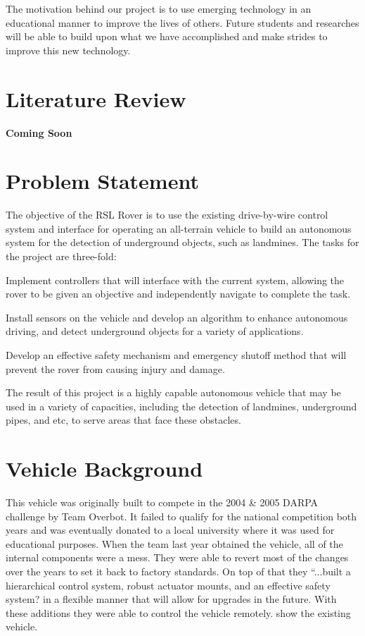 The motivation behind our project is to use emerging technology in an educational manner to improve the lives of others.  Future students and researches will be able to build upon what we have accomplished and make strides to improve this new technology.

\section{Literature Review}

{\bf Coming Soon}

\section{Problem Statement}

The objective of the RSL Rover is to use the existing drive-by-wire control system and interface for operating an all-terrain vehicle to build an autonomous system for the detection of underground objects, such as landmines. The tasks for the project are three-fold:\\
\begin{compactitem}
\item Implement controllers that will interface with the current system, allowing the rover to be given an objective and independently navigate to complete the task.
\item Install sensors on the vehicle and develop an algorithm to enhance autonomous driving, and detect underground objects for a variety of applications. 
\item Develop an effective safety mechanism and emergency shutoff method that will prevent the rover from causing injury and damage.
\end{compactitem}
The result of this project is a highly capable autonomous vehicle that may be used in a variety of capacities, including the detection of landmines, underground pipes, and etc, to serve areas that face these obstacles.

\section{Vehicle Background}

This vehicle was originally built to compete in the 2004 \& 2005 DARPA challenge by Team Overbot.  It failed to qualify for the national competition both years and was eventually donated to a local university where it was used for educational purposes.  When the team last year obtained the vehicle, all of the internal components were a mess.  They were able to revert most of the changes over the years to set it back to factory standards.  On top of that they ``...built a hierarchical control system, robust actuator mounts, and an effective safety system? \cite{UnmannedAerialAndGround} in a flexible manner that will allow for upgrades in the future. With these additions they were able to control the vehicle remotely.  show the existing vehicle.

